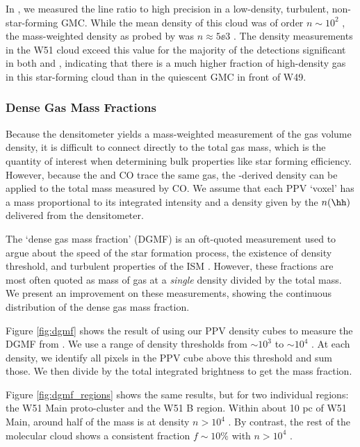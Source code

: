 In \citet{Ginsburg2013b}, we measured the \formaldehyde line ratio to high
precision in a low-density, turbulent, non-star-forming GMC.  While the mean
density of this cloud was of order $n\sim10^2$ \percc, the mass-weighted
density as probed by \formaldehyde was $n\approx5\ee{3}$ \percc.  The density
measurements in the W51 cloud exceed this value for the majority of the
detections significant in both \oneone and \twotwo, indicating that there is a
much higher fraction of high-density gas in this star-forming cloud than in the
quiescent GMC in front of W49.

\subsubsection{Dense Gas Mass Fractions}
Because the \formaldehyde densitometer yields a mass-weighted measurement of
the gas volume density, it is difficult to connect directly to the total gas
mass, which is the quantity of interest when determining bulk properties like
star forming efficiency.  However, because the \formaldehyde and CO trace the
same gas, the \formaldehyde-derived density can be applied to the total mass
measured by CO.  We assume that each \thirteenco PPV `voxel' has a mass
proportional to its integrated intensity and a density given by the $n(\hh)$
delivered from the \formaldehyde densitometer.

The `dense gas mass fraction' (DGMF) is an oft-quoted measurement used to argue
about the speed of the star formation process, the existence of density
threshold, and turbulent properties of the ISM \citep[e.g. Fig. 5
of][]{Krumholz2007a,Battistia2014a,Kainulainen2013a,Juneau2009a,Muraoka2009a,Hopkins2013e}.
However, these fractions are most often quoted as mass of gas at a \emph{single}
density divided by the total mass.  We present an improvement on these measurements,
showing the continuous distribution of the dense gas mass fraction.

Figure \ref{fig:dgmf} shows the result of using our \formaldehyde PPV density
cubes to measure the DGMF from \thirteenco.  We use a range of density
thresholds from $\sim10^3$ to $\sim10^4$ \percc.  At each density, we identify
all pixels in the \thirteenco PPV cube above this threshold and sum those.  We
then divide by the total integrated \thirteenco brightness to get the mass
fraction. 

Figure \ref{fig:dgmf_regions} shows the same results, but for two individual
regions: the W51 Main proto-cluster and the W51 B region.  Within about 10 pc
of W51 Main, around half of the mass is at density $n>10^4$ \percc.  By
contrast, the rest of the molecular cloud shows a consistent fraction
$f\sim10\%$ with $n>10^4$ \percc.


